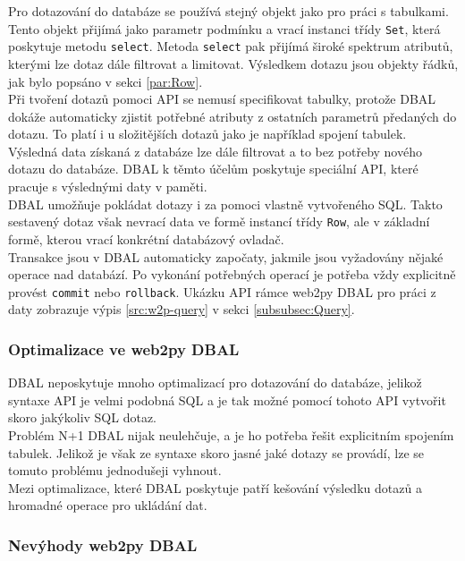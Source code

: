 \documentclass[ing,male,java,dept456]{diploma}						%
\begin{document}
Pro dotazování do databáze se používá stejný objekt jako pro práci s tabulkami. Tento objekt přijímá jako parametr podmínku a vrací instanci třídy \lstinline[style=inlinepython]|Set|, která poskytuje metodu \lstinline[style=inlinepython]|select|. Metoda \lstinline[style=inlinepython]|select| pak přijímá široké spektrum atributů, kterými lze dotaz dále filtrovat a limitovat. Výsledkem dotazu jsou objekty řádků, jak bylo popsáno v sekci \ref{par:Row}. \\
Při tvoření dotazů pomoci API se nemusí specifikovat tabulky, protože DBAL dokáže automaticky zjistit potřebné atributy z ostatních parametrů předaných do dotazu. To platí i u složitějších dotazů jako je například spojení tabulek. \\
Výsledná data získaná z databáze lze dále filtrovat a to bez potřeby nového dotazu do databáze. DBAL k těmto účelům poskytuje speciální API, které pracuje s výslednými daty v paměti. \\
DBAL umožňuje pokládat dotazy i za pomoci vlastně vytvořeného SQL. Takto sestavený dotaz však nevrací data ve formě instancí třídy \lstinline[style=inlinepython]|Row|, ale v základní formě, kterou vrací konkrétní databázový ovladač. \\
Transakce jsou v DBAL automaticky započaty, jakmile jsou vyžadovány nějaké operace nad databází. Po vykonání potřebných operací je potřeba vždy explicitně provést \lstinline[style=inlinepython]|commit| nebo \lstinline[style=inlinepython]|rollback|. Ukázku API rámce web2py DBAL pro práci z daty zobrazuje výpis \ref{src:w2p-query} v sekci \ref{subsubsec:Query}.

\subsubsection{Optimalizace ve web2py DBAL}
DBAL neposkytuje mnoho optimalizací pro dotazování do databáze, jelikož syntaxe API je velmi podobná SQL a je tak možné pomocí tohoto API vytvořit skoro jakýkoliv SQL dotaz.  \\
Problém N+1 DBAL nijak neulehčuje, a je ho potřeba řešit explicitním spojením tabulek. Jelikož je však ze syntaxe skoro jasné jaké dotazy se provádí, lze se tomuto problému jednodušeji vyhnout. \\
Mezi optimalizace, které DBAL poskytuje patří kešování výsledku dotazů a hromadné operace pro ukládání dat. \\

\subsubsection{Nevýhody web2py DBAL}
\label{subsubsec:web2py-cons}
\end{document}

